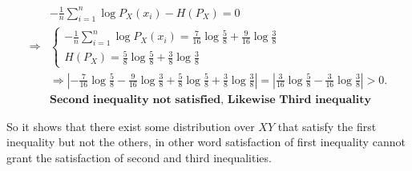 \documentclass[
  course = {{EE623 Information Theory}},
  quartile = {{Fall 2020}},
  assignment = 6,
  name = {{Mohammad Mahdi Rahimi}},
  studentnumber = {{20208244}},
  email = {{mahi@kaist.ac.kr}},
  firstexercise = 1
]{aga-homework}
\begin{document}
\begin{equation} \label{eq3}
\begin{split}
& -\frac{1}{n} \sum_{i=1}^{n} \log{P_{X}(x_i)} - H(P_{X}) = 0 \\
\Rightarrow & \begin{cases}
-\frac{1}{n} \sum_{i=1}^{n} \log{P_{X}(x_i)} = \frac{7}{16}\log\frac{5}{8} + \frac{9}{16}\log\frac{3}{8}\\
H(P_{X}) = \frac{5}{8}\log\frac{5}{8} + \frac{3}{8}\log\frac{3}{8}
\end{cases}\\
& \Rightarrow \left|-\frac{7}{16}\log\frac{5}{8} - \frac{9}{16}\log\frac{3}{8} + \frac{5}{8}\log\frac{5}{8} + \frac{3}{8}\log\frac{3}{8}\right| = \left|\frac{3}{16}\log\frac{5}{8} - \frac{3}{16}\log\frac{3}{8} \right| > 0.\\
&\textbf{Second inequality not satisfied, Likewise Third inequality}
\end{split}
\end{equation}

So it shows that there exist some distribution over $XY$ that satisfy the first inequality but not the others, in other word satisfaction of first inequality cannot grant the satisfaction of second and third inequalities. 
\end{document}
